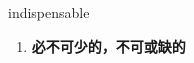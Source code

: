 
\begin{frame}
{\huge indispensable}
\begin{center}
\begin{enumerate}\Large
  \item \textbf{必不可少的，不可或缺的}
\end{enumerate}
\end{center}
\end{frame}
